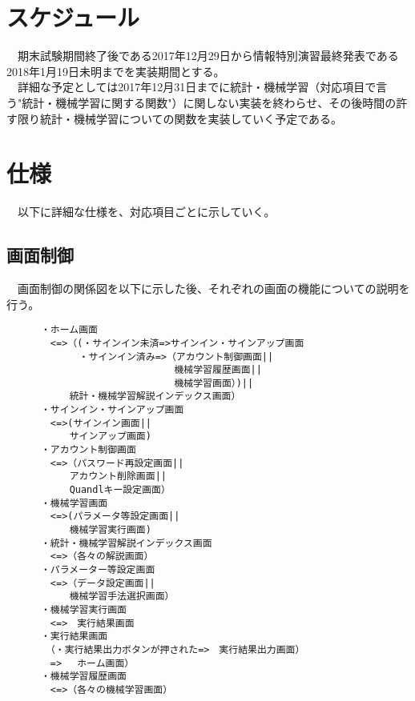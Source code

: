 \documentclass{scrartcl}
\begin{document}
\section{スケジュール}
\label{sec:org37d93cb}
　期末試験期間終了後である2017年12月29日から情報特別演習最終発表である2018年1月19日未明までを実装期間とする。\\
　詳細な予定としては2017年12月31日までに統計・機械学習（対応項目で言う"統計・機械学習に関する関数"）に関しない実装を終わらせ、その後時間の許す限り統計・機械学習についての関数を実装していく予定である。\\

\section{仕様}
\label{sec:orgd3bc03d}
　以下に詳細な仕様を、対応項目ごとに示していく。\\

\subsection{画面制御}
\label{sec:org6ec2cd9}
　画面制御の関係図を以下に示した後、それぞれの画面の機能についての説明を行う。\\
\begin{verbatim}
      ・ホーム画面
      　<=>（(・サインイン未済=>サインイン・サインアップ画面
      　　　　・サインイン済み=>（アカウント制御画面||
      　　　　　　　　　　　　　　機械学習履歴画面||
      　　　　　　　　　　　　　　機械学習画面）)||
      　　　統計・機械学習解説インデックス画面）
      ・サインイン・サインアップ画面
      　<=>(サインイン画面||
      　　　サインアップ画面)
      ・アカウント制御画面
      　<=>（パスワード再設定画面||
      　　　アカウント削除画面||
      　　　Quandlキー設定画面）
      ・機械学習画面
      　<=>(パラメータ等設定画面||
      　　　機械学習実行画面)
      ・統計・機械学習解説インデックス画面
      　<=>（各々の解説画面）
      ・パラメーター等設定画面
      　<=>（データ設定画面||
      　　　機械学習手法選択画面）
      ・機械学習実行画面
      　<=>　実行結果画面
      ・実行結果画面
      　（・実行結果出力ボタンが押された=>　実行結果出力画面）
      　=> 　ホーム画面）
      ・機械学習履歴画面
      　<=>（各々の機械学習画面）
\end{verbatim}
\end{document}
